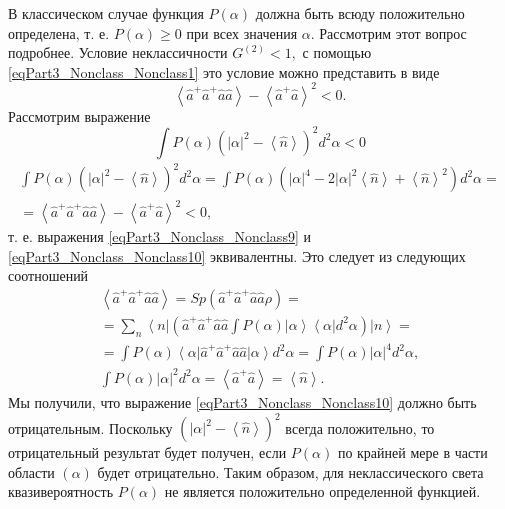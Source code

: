 В классическом случае функция $P\left(\alpha\right)$ должна быть всюду
положительно определена, т. е. $P\left(\alpha\right) \ge 0$ при всех
значения $\alpha$. Рассмотрим этот вопрос подробнее. Условие
неклассичности 
\(
G^{(2)} < 1, 
\)
с помощью \eqref{eqPart3_Nonclass_Nonclass1} это условие
можно представить в виде
\begin{equation}
\left<\hat{a}^{+}\hat{a}^{+}\hat{a}\hat{a}\right> -
\left<\hat{a}^{+}\hat{a}\right>^2 < 0.
\label{eqPart3_Nonclass_Nonclass9}
\end{equation}
Рассмотрим выражение
\begin{equation}
\int P\left(\alpha\right)\left(\left|\alpha\right|^2 -
\left<\hat{n}\right>\right)^2 d^2\alpha < 0
\label{eqPart3_Nonclass_Nonclass10}
\end{equation}
\begin{eqnarray}
\int P\left(\alpha\right)\left(\left|\alpha\right|^2 -
\left<\hat{n}\right>\right)^2 d^2\alpha = 
\int P\left(\alpha\right)\left(\left|\alpha\right|^4 -
2\left|\alpha\right|^2 \left<\hat{n}\right> +
\left<\hat{n}\right>^2\right) d^2\alpha = 
\nonumber \\
=
\left<\hat{a}^{+}\hat{a}^{+}\hat{a}\hat{a}\right> -
\left<\hat{a}^{+}\hat{a}\right>^2 < 0,
\nonumber
\end{eqnarray}
т. е. выражения \eqref{eqPart3_Nonclass_Nonclass9} и
\eqref{eqPart3_Nonclass_Nonclass10} эквивалентны. Это следует из
следующих соотношений
\begin{eqnarray}
  \left<\hat{a}^{+}\hat{a}^{+}\hat{a}\hat{a}\right> = Sp \left(
  \hat{a}^{+}\hat{a}^{+}\hat{a}\hat{a} \rho \right)=
  \nonumber \\
  =
  \sum_n \left<n\right|\left(\hat{a}^{+}\hat{a}^{+}\hat{a}\hat{a}
  \int P\left(\alpha\right)
  \left|\alpha\right>\left<\alpha\right|d^2\alpha
  \right)
  \left|n\right> =
  \nonumber \\
  =
  \int P\left(\alpha\right)
  \left<\alpha\right|\hat{a}^{+}\hat{a}^{+}\hat{a}\hat{a}\left|\alpha\right>
  d^2\alpha = 
\int P\left(\alpha\right)\left|\alpha\right|^4 d^2\alpha,
\nonumber \\
\int P\left(\alpha\right)\left|\alpha\right|^2 d^2\alpha = 
\left<\hat{a}^{+}\hat{a}\right> = \left<\hat{n}\right>.
\nonumber
\end{eqnarray}
Мы получили, что выражение \eqref{eqPart3_Nonclass_Nonclass10} должно
быть отрицательным. Поскольку 
\(
\left(\left|\alpha\right|^2 -
\left<\hat{n}\right>\right)^2
\)
всегда положительно, то отрицательный результат будет получен, если 
$P\left(\alpha\right)$ по крайней мере в части области $(\alpha)$
будет отрицательно. Таким образом, для неклассического света
квазивероятность $P\left(\alpha\right)$ не является положительно
определенной функцией.

